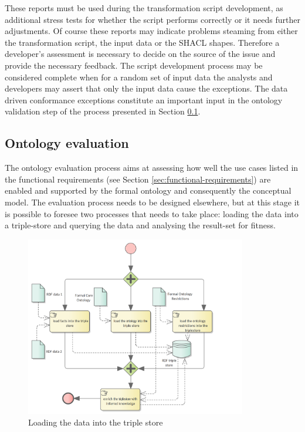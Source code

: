 	These reports must be used during the transformation script development, as additional stress tests for whether the script performs correctly or it needs further adjustments. Of course these reports may indicate problems steaming from either the transformation script, the input data or the SHACL shapes. Therefore a developer's assessment is necessary to decide on the source of the issue and provide the necessary feedback. The script development process may be considered complete when for a random set of input data the analysts and developers may assert that only the input data cause the exceptions. The data driven conformance exceptions constitute an important input in the ontology validation step of the process presented in Section \ref{sec:ontology-validation}.
	
	\subsection{Ontology evaluation}
	\label{sec:ontology-validation}
	
	The ontology evaluation process aims at assessing how well the use cases listed in the functional requirements (see Section \ref{sec:functional-requirements}) are enabled and supported by the formal ontology and consequently the conceptual model. The evaluation process needs to be designed elsewhere, but at this stage it is possible to foresee two processes that needs to take place: loading the data into a triple-store and querying the data and analysing the result-set for fitness. 

	\begin{figure}[!ht]		
		\centering
		\includegraphics[width=0.86\textwidth]{../img/loading-data.png}
		\caption{Loading the data into the triple store}
		\label{fig:loading-date}
	\end{figure}

